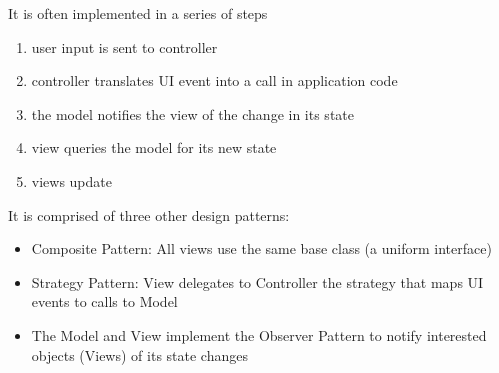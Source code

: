 \documentclass[12pt]{article}
\begin{document}
It is often implemented in a series of steps
\begin{enumerate}
    \item user input is sent to controller
    \item controller translates UI event into a call in application code
    \item the model notifies the view of the change in its state
    \item view queries the model for its new state
    \item views update
\end{enumerate}

It is comprised of three other design patterns:
\begin{itemize}
    \item Composite Pattern: All views use the same base class (a uniform interface)
    \item Strategy Pattern: View delegates to Controller the strategy that maps UI events to calls to Model
    \item The Model and View implement the Observer Pattern to notify interested objects (Views) of its state changes
\end{itemize}
\end{document}
